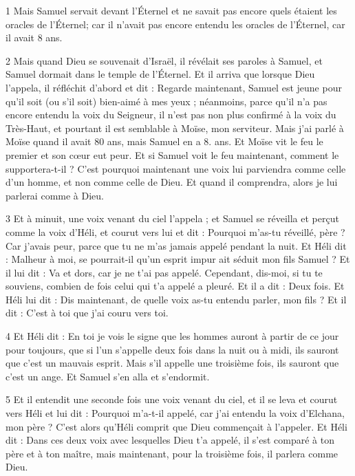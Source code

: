 
\par 1 Mais Samuel servait devant l'Éternel et ne savait pas encore quels étaient les oracles de l'Éternel; car il n'avait pas encore entendu les oracles de l'Éternel, car il avait 8 ans.

\par 2 Mais quand Dieu se souvenait d'Israël, il révélait ses paroles à Samuel, et Samuel dormait dans le temple de l'Éternel. Et il arriva que lorsque Dieu l'appela, il réfléchit d'abord et dit : Regarde maintenant, Samuel est jeune pour qu'il soit (ou s'il soit) bien-aimé à mes yeux ; néanmoins, parce qu'il n'a pas encore entendu la voix du Seigneur, il n'est pas non plus confirmé à la voix du Très-Haut, et pourtant il est semblable à Moïse, mon serviteur. Mais j'ai parlé à Moïse quand il avait 80 ans, mais Samuel en a 8. ans. Et Moïse vit le feu le premier et son cœur eut peur. Et si Samuel voit le feu maintenant, comment le supportera-t-il ? C’est pourquoi maintenant une voix lui parviendra comme celle d’un homme, et non comme celle de Dieu. Et quand il comprendra, alors je lui parlerai comme à Dieu.

\par 3 Et à minuit, une voix venant du ciel l'appela ; et Samuel se réveilla et perçut comme la voix d'Héli, et courut vers lui et dit : Pourquoi m'as-tu réveillé, père ? Car j'avais peur, parce que tu ne m'as jamais appelé pendant la nuit. Et Héli dit : Malheur à moi, se pourrait-il qu'un esprit impur ait séduit mon fils Samuel ? Et il lui dit : Va et dors, car je ne t'ai pas appelé. Cependant, dis-moi, si tu te souviens, combien de fois celui qui t'a appelé a pleuré. Et il a dit : Deux fois. Et Héli lui dit : Dis maintenant, de quelle voix as-tu entendu parler, mon fils ? Et il dit : C'est à toi que j'ai couru vers toi.

\par 4 Et Héli dit : En toi je vois le signe que les hommes auront à partir de ce jour pour toujours, que si l'un s'appelle deux fois dans la nuit ou à midi, ils sauront que c'est un mauvais esprit. Mais s'il appelle une troisième fois, ils sauront que c'est un ange. Et Samuel s'en alla et s'endormit.

\par 5 Et il entendit une seconde fois une voix venant du ciel, et il se leva et courut vers Héli et lui dit : Pourquoi m'a-t-il appelé, car j'ai entendu la voix d'Elchana, mon père ? C'est alors qu'Héli comprit que Dieu commençait à l'appeler. Et Héli dit : Dans ces deux voix avec lesquelles Dieu t'a appelé, il s'est comparé à ton père et à ton maître, mais maintenant, pour la troisième fois, il parlera comme Dieu.

